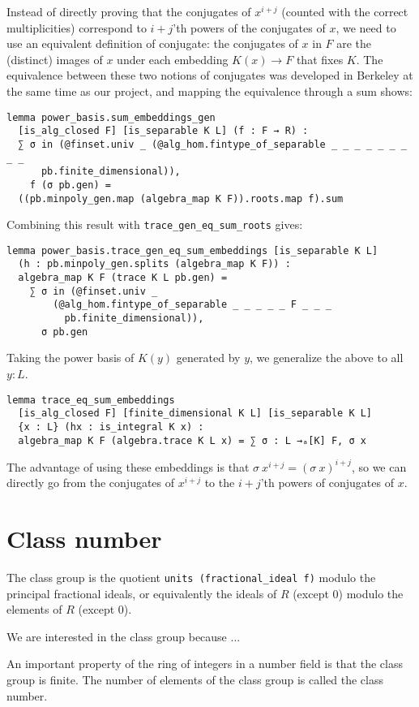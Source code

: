 \documentclass[a4paper,USenglish,cleveref, autoref, thm-restate]{lipics-v2021}
\newcommand{\lean}[1]{\texttt{#1}\xspace} %
\begin{document}
Instead of directly proving that the conjugates of $x^{i + j}$ (counted with the correct multiplicities) correspond to $i + j$'th powers of the conjugates of $x$,
we need to use an equivalent definition of conjugate:
the conjugates of $x$ in $F$ are the (distinct) images of $x$ under each embedding $K(x) \to F$ that fixes $K$.
The equivalence between these two notions of conjugates was developed in Berkeley at the same time as our project, and mapping the equivalence through a sum shows: %
\begin{lstlisting}
lemma power_basis.sum_embeddings_gen
  [is_alg_closed F] [is_separable K L] (f : F → R) :
  ∑ σ in (@finset.univ _ (@alg_hom.fintype_of_separable _ _ _ _ _ _ _ _ _
      pb.finite_dimensional)),
    f (σ pb.gen) =
  ((pb.minpoly_gen.map (algebra_map K F)).roots.map f).sum
\end{lstlisting}
Combining this result with \lean{trace\_gen\_eq\_sum\_roots} gives:
\begin{lstlisting}
lemma power_basis.trace_gen_eq_sum_embeddings [is_separable K L]
  (h : pb.minpoly_gen.splits (algebra_map K F)) :
  algebra_map K F (trace K L pb.gen) =
    ∑ σ in (@finset.univ _
        (@alg_hom.fintype_of_separable _ _ _ _ _ F _ _ _
          pb.finite_dimensional)),
      σ pb.gen
\end{lstlisting}
Taking the power basis of $K(y)$ generated by $y$, we generalize the above to all $y : L$.
\begin{lstlisting}
lemma trace_eq_sum_embeddings
  [is_alg_closed F] [finite_dimensional K L] [is_separable K L]
  {x : L} (hx : is_integral K x) :
  algebra_map K F (algebra.trace K L x) = ∑ σ : L →ₐ[K] F, σ x
\end{lstlisting}
The advantage of using these embeddings is that $\sigma\ x^{i + j} = (\sigma\ x)^{i + j}$,
so we can directly go from the conjugates of $x^{i + j}$ to the $i + j$'th powers of conjugates of $x$.

\section{Class number} \label{sec:class-number}

The class group is the quotient \lean{units (fractional\_ideal f)} modulo the principal fractional ideals, or equivalently the ideals of $R$ (except $0$) modulo the elements of $R$ (except $0$).

We are interested in the class group because ...

An important property of the ring of integers in a number field is that the class group is finite. The number of elements of the class group is called the class number.
\end{document}
